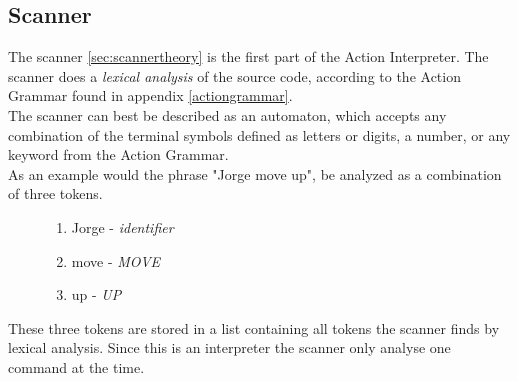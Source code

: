 \subsection{Scanner}
\label{sec:ai_scanner}
The scanner \ref{sec:scannertheory} is the first part of the Action Interpreter. The scanner does a \textit{lexical analysis} of the source code, according to the Action Grammar found in appendix \ref{actiongrammar}.\\
The scanner can best be described as an automaton, which accepts any combination of the terminal symbols defined as letters or digits, a number, or any keyword from the Action Grammar.\\
As an example would the phrase "Jorge move up", be analyzed as a combination of three tokens.\\

\begin{figure}[h]
\begin{enumerate}
\item Jorge - \textit{identifier}
\item move - \textit{MOVE}
\item up - \textit{UP}
\end{enumerate}
\end{figure}

These three tokens are stored in a list containing all tokens the scanner finds by lexical analysis. Since this is an interpreter the scanner only analyse one command at the time.\\